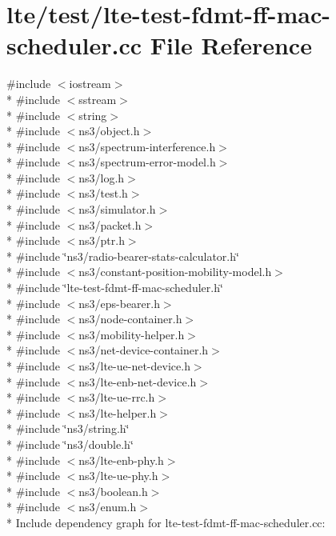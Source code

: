 \hypertarget{lte-test-fdmt-ff-mac-scheduler_8cc}{}\section{lte/test/lte-\/test-\/fdmt-\/ff-\/mac-\/scheduler.cc File Reference}
\label{lte-test-fdmt-ff-mac-scheduler_8cc}
{\ttfamily \#include $<$iostream$>$}\\*
{\ttfamily \#include $<$sstream$>$}\\*
{\ttfamily \#include $<$string$>$}\\*
{\ttfamily \#include $<$ns3/object.\+h$>$}\\*
{\ttfamily \#include $<$ns3/spectrum-\/interference.\+h$>$}\\*
{\ttfamily \#include $<$ns3/spectrum-\/error-\/model.\+h$>$}\\*
{\ttfamily \#include $<$ns3/log.\+h$>$}\\*
{\ttfamily \#include $<$ns3/test.\+h$>$}\\*
{\ttfamily \#include $<$ns3/simulator.\+h$>$}\\*
{\ttfamily \#include $<$ns3/packet.\+h$>$}\\*
{\ttfamily \#include $<$ns3/ptr.\+h$>$}\\*
{\ttfamily \#include \char`\"{}ns3/radio-\/bearer-\/stats-\/calculator.\+h\char`\"{}}\\*
{\ttfamily \#include $<$ns3/constant-\/position-\/mobility-\/model.\+h$>$}\\*
{\ttfamily \#include \char`\"{}lte-\/test-\/fdmt-\/ff-\/mac-\/scheduler.\+h\char`\"{}}\\*
{\ttfamily \#include $<$ns3/eps-\/bearer.\+h$>$}\\*
{\ttfamily \#include $<$ns3/node-\/container.\+h$>$}\\*
{\ttfamily \#include $<$ns3/mobility-\/helper.\+h$>$}\\*
{\ttfamily \#include $<$ns3/net-\/device-\/container.\+h$>$}\\*
{\ttfamily \#include $<$ns3/lte-\/ue-\/net-\/device.\+h$>$}\\*
{\ttfamily \#include $<$ns3/lte-\/enb-\/net-\/device.\+h$>$}\\*
{\ttfamily \#include $<$ns3/lte-\/ue-\/rrc.\+h$>$}\\*
{\ttfamily \#include $<$ns3/lte-\/helper.\+h$>$}\\*
{\ttfamily \#include \char`\"{}ns3/string.\+h\char`\"{}}\\*
{\ttfamily \#include \char`\"{}ns3/double.\+h\char`\"{}}\\*
{\ttfamily \#include $<$ns3/lte-\/enb-\/phy.\+h$>$}\\*
{\ttfamily \#include $<$ns3/lte-\/ue-\/phy.\+h$>$}\\*
{\ttfamily \#include $<$ns3/boolean.\+h$>$}\\*
{\ttfamily \#include $<$ns3/enum.\+h$>$}\\*
Include dependency graph for lte-\/test-\/fdmt-\/ff-\/mac-\/scheduler.cc\+:
